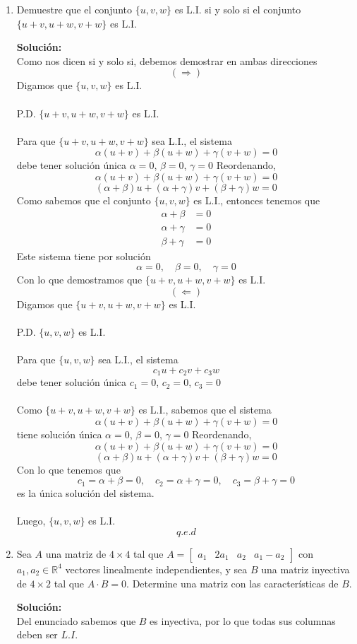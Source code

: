 \documentclass[12pt]{article}
\newenvironment{solucion}
{\begin{mdframed}[backgroundcolor=black!10]
		{\bf Solución:}\\
	}
	{
	\end{mdframed}
}
\newenvironment{preguntas}
{\begin{enumerate}\itemsep12pt
	}
	{
	\end{enumerate}
}
\newcommand{\R}{\mathbb{R}}
\begin{document}
\begin{preguntas}
\begin{solucion}
\end{solucion}
\item Demuestre que el conjunto $\{u, v, w\}$ es L.I. si y solo si el conjunto $\{u+v, u+w, v+w\}$ es L.I.
\begin{solucion}
Como nos dicen si y solo si, debemos demostrar en ambas direcciones
		$$(\Longrightarrow)$$
		Digamos que $\{u, v, w\}$ es L.I.\\
		\\
		P.D. $\{u+v, u+w, v+w\}$ es L.I.\\
		\\
		Para que $\{u+v, u+w, v+w\}$ sea L.I., el sistema
		$$\alpha (u+v) + \beta (u+w) + \gamma (v+w) = 0$$
		debe tener solución única $\alpha = 0$, $\beta = 0$, $\gamma = 0$
		Reordenando,
		$$\alpha (u+v) + \beta (u+w) + \gamma (v+w) = 0$$
		$$(\alpha + \beta) u + (\alpha + \gamma) v + (\beta + \gamma) w = 0$$
		Como sabemos que el conjunto $\{u, v, w\}$ es L.I., entonces tenemos que
		$$\begin{array}{rl}
		\alpha + \beta & = 0\\
		\alpha + \gamma & = 0\\
		\beta + \gamma & = 0
		\end{array}$$
		Este sistema tiene por solución
		$$\alpha = 0, \quad \beta = 0, \quad \gamma = 0$$
		Con lo que demostramos que $\{u+v, u+w, v+w\}$ es L.I.
		$$(\Longleftarrow)$$
		Digamos que $\{u+v, u+w, v+w\}$ es L.I.\\
		\\
		P.D. $\{u, v, w\}$ es L.I.\\
		\\
		Para que $\{u, v, w\}$ sea L.I., el sistema
		$$c_1u + c_2v + c_3w$$
		debe tener solución única $c_1 = 0$, $c_2 = 0$, $c_3 = 0$\\
		\\
		Como $\{u+v, u+w, v+w\}$ es L.I., sabemos que el sistema
		$$\alpha (u+v) + \beta (u+w) + \gamma (v+w) = 0$$
		tiene solución única $\alpha = 0$, $\beta = 0$, $\gamma = 0$
		Reordenando,
		$$\alpha (u+v) + \beta (u+w) + \gamma (v+w) = 0$$
		$$(\alpha + \beta) u + (\alpha + \gamma) v + (\beta + \gamma) w = 0$$
		Con lo que tenemos que
		$$c_1 = \alpha + \beta = 0, \quad c_2 = \alpha + \gamma = 0, \quad c_3 = \beta + \gamma = 0$$
		es la única solución del sistema. \\
		\\
		Luego, $\{u, v, w\}$ es L.I.
		$$q.e.d$$
\end{solucion}
\item Sea $A$ una matriz de $4 \times 4$ tal que $A=\begin{bmatrix}a_1 & 2a_1 & a_2 & a_1-a_2\end{bmatrix}$ con $a_1, a_2 \in \R^4$ vectores linealmente independientes, y sea $B$ una matriz inyectiva de $4 \times 2$ tal que $A \cdot B = 0$. Determine una matriz con las características de $B$.
\begin{solucion}
Del enunciado sabemos que $B$ es inyectiva, por lo que todas sus columnas deben ser $L.I.$\\


\end{solucion}
\end{preguntas}
\end{document}
